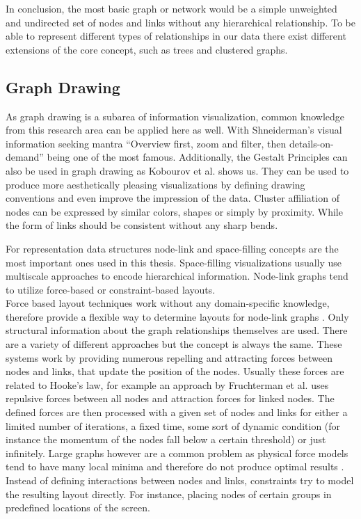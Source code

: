 In conclusion, the most basic graph or network would be a simple unweighted and undirected set of nodes and links without any hierarchical relationship. To be able to represent different types of relationships in our data there exist different extensions of the core concept, such as trees and clustered graphs. 

\subsection{Graph Drawing}

As graph drawing is a subarea of information visualization, common knowledge from this research area can be applied here as well. With Shneiderman's visual information seeking mantra “Overview first, zoom and filter, then details-on-demand” \cite{shneiderman_eyes_1996} being one of the most famous. Additionally, the Gestalt Principles can also be used in graph drawing as Kobourov et al.
\cite{kobourov_gestalt_2015} shows us. They can be used to produce more aesthetically pleasing visualizations by defining drawing conventions and even improve the impression of the data. Cluster affiliation of nodes can be expressed by similar colors, shapes or simply by proximity. While the form of links should be consistent without any sharp bends.

For representation data structures node-link and space-filling concepts are the most important ones used in this thesis. Space-filling visualizations usually use multiscale approaches to encode hierarchical information. Node-link graphs tend to utilize force-based or constraint-based layouts\cite{von_landesberger_visual_2011}.\\
Force based\label{exp:force_based_background} layout techniques work without any domain-specific knowledge, therefore provide a flexible way to determine layouts for node-link graphs \cite{kobourov_spring_2012}. Only structural information about the graph relationships themselves are used. 
There are a variety of different approaches but the concept is always the same. 
These systems work by providing numerous repelling and attracting forces between nodes and links, that update the position of the nodes. Usually these forces are related to Hooke's law, for example an approach by Fruchterman et al. \cite{fruchterman_graph_1991} uses repulsive forces between all nodes and attraction forces for linked nodes.
The defined forces are then processed with a given set of nodes and links for either a limited number of iterations, a fixed time, some sort of dynamic condition (for instance the momentum of the nodes fall below a certain threshold) or just infinitely.
Large graphs however are a common problem as physical force models tend to have many local minima and therefore do not produce optimal results \cite{kobourov_spring_2012}.\\
Instead of defining interactions between nodes and links, constraints try to model the resulting layout directly. For instance, placing nodes of certain groups in predefined locations of the screen.   

